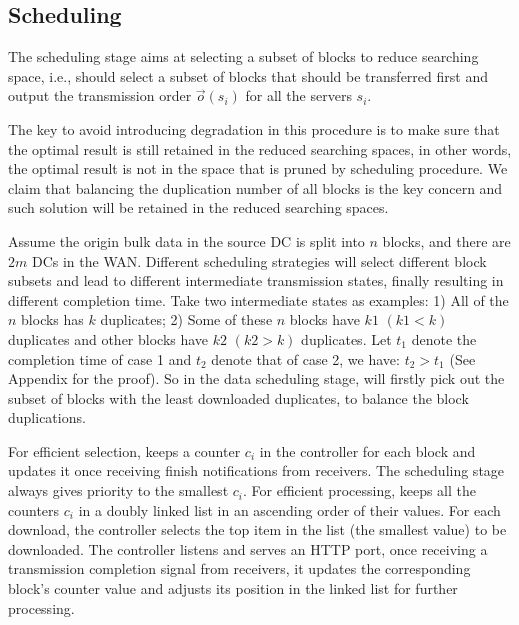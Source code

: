

\subsection{Scheduling}
\label{subsec:logic:scheduling}

The scheduling stage aims at selecting a subset of blocks to reduce searching space, i.e., \name should select a subset of blocks that should be transferred first and output the transmission order $\overrightarrow{o}(s_i)$ for all the servers $s_i$.

The key to avoid introducing degradation in this procedure is to make sure that the optimal result is still retained in the reduced searching spaces, in other words, the optimal result is not in the space that is pruned by scheduling procedure. We claim that balancing the duplication number of all blocks is the key concern and such solution will be retained in the reduced searching spaces.

Assume the origin bulk data in the source DC is split into $n$ blocks, and there are $2m$ DCs in the WAN. Different scheduling strategies will select different block subsets and lead to different intermediate transmission states, finally resulting in different completion time. Take two intermediate states as examples: 1) All of the $n$ blocks has $k$ duplicates; 2) Some of these $n$ blocks have $k1$ $(k1<k)$ duplicates and other blocks have $k2$ $(k2>k)$ duplicates. Let $t_1$ denote the completion time of case 1 and $t_2$ denote that of case 2, we have: $t_2 > t_1$ (See Appendix for the proof). So in the data scheduling stage, \name will firstly pick out the subset of blocks with the least downloaded duplicates, to balance the block duplications.

For efficient selection, \name keeps a counter $c_i$ in the controller for each block and updates it once receiving finish notifications from receivers. The scheduling stage always gives priority to the smallest $c_i$. For efficient processing, \name keeps all the counters $c_i$ in a doubly linked list in an ascending order of their values. For each download, the controller selects the top item in the list (the smallest value) to be downloaded. The controller listens and serves an HTTP port, once receiving a transmission completion signal from receivers, it updates the corresponding block's counter value and adjusts its position in the linked list for further processing.

